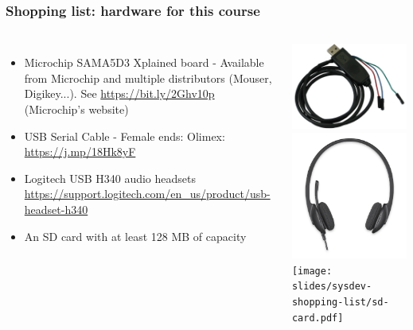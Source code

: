 \begin{frame}
\frametitle{Shopping list: hardware for this course}
  \begin{columns}
    \footnotesize
    \begin{itemize}
      \item Microchip SAMA5D3 Xplained board - Available from Microchip and
	    multiple distributors (Mouser, Digikey...).
	    See \url{https://bit.ly/2Ghv10p} (Microchip's website)
      \item USB Serial Cable - Female ends:
	    Olimex: \url{https://j.mp/18Hk8yF} \\
      \item Logitech USB H340 audio headsets
	    \url{https://support.logitech.com/en_us/product/usb-headset-h340}
      \item An SD card with at least 128 MB of capacity
    \end{itemize}
    \includegraphics[height=0.20\textheight]{slides/sysdev-shopping-list/usb-serial-cable-female.png} \\
    \vspace{1cm}
    \includegraphics[height=0.15\textheight]{slides/sysdev-shopping-list/logitech-h340.png} \\
    \vspace{1cm}
    \texttt{[image: slides/sysdev-shopping-list/sd-card.pdf]}
  \end{columns}
\end{frame}
